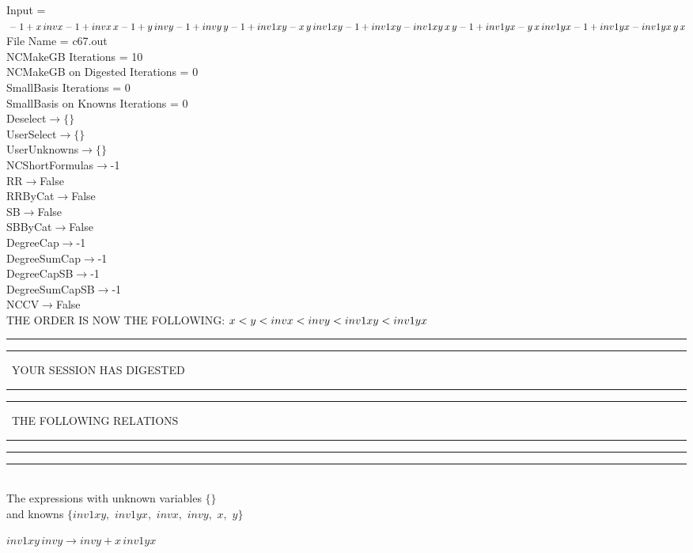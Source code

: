 \documentclass[rep10,leqno]{report}
\begin{document}
\normalsize
\baselineskip=12pt
\noindent
Input = 
$
\\-1 + x\,
 invx\\
-1 + invx\,
 x\\
-1 + y\,
 invy\\
-1 + invy\,
 y\\
-1 + inv1xy - x\,
 y\,
 inv1xy\\
-1 + inv1xy - inv1xy\,
 x\,
 y\\
-1 + inv1yx - y\,
 x\,
 inv1yx\\
-1 + inv1yx - inv1yx\,
 y\,
 x\\
$
File Name = c67.out\\
NCMakeGB Iterations = 10\\
NCMakeGB on Digested Iterations = 0\\
SmallBasis Iterations = 0\\
SmallBasis on Knowns Iterations = 0\\
Deselect$\rightarrow \{\}$\\
UserSelect$\rightarrow \{\}$\\
UserUnknowns$\rightarrow \{\}$\\
NCShortFormulas$\rightarrow$-1\\
RR$\rightarrow $False\\
RRByCat$\rightarrow $False\\
SB$\rightarrow $False\\
SBByCat$\rightarrow $False\\
DegreeCap$\rightarrow $-1\\
DegreeSumCap$\rightarrow $-1\\
DegreeCapSB$\rightarrow $-1\\
DegreeSumCapSB$\rightarrow $-1\\
NCCV$\rightarrow $False\\
THE ORDER IS NOW THE FOLLOWING:\hfil\break
$
x<y<invx<invy<inv1xy<inv1yx\\
$
\rule[2pt]{6in}{4pt}\hfil\break
\rule[2pt]{1.879in}{4pt}
\ YOUR SESSION HAS DIGESTED\ 
\rule[2pt]{1.879in}{4pt}\hfil\break
\rule[2pt]{1.923in}{4pt}
\ THE FOLLOWING RELATIONS\ 
\rule[2pt]{1.923in}{4pt}\hfil\break
\rule[2pt]{6in}{4pt}\hfil\break
\rule[3pt]{6in}{.7pt}\\
The expressions with unknown variables $\{\}$\\
and knowns $\{inv1xy,
$ $
inv1yx,
$ $
invx,
$ $
invy,
$ $
x,
$ $
y\}$\smallskip\\
\begin{minipage}{6in}
$
inv1xy\,
 invy\rightarrow invy + x\,
 inv1yx
$
\end{minipage}\medskip \\
\end{document}
